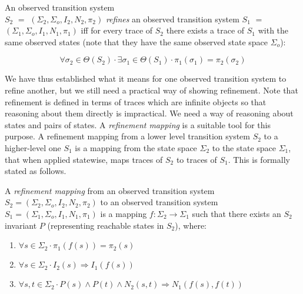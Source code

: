 \begin{definition}[Refinement]
\label{def-refinement}
An observed transition system\\ 
  $S_2$ $=$ $(\Sigma_2,\Sigma_o,I_2,N_2,\pi_2)$ 
{\em refines} an observed transition system   
  $S_1$ $=$ $(\Sigma_1,\Sigma_o,I_1,N_1,\pi_1)$ 
iff 
for every trace of $S_2$ there exists a trace of $S_1$ with the same observed states
(note that they have the same observed state space $\Sigma_o$):

\[
  \forall \sigma_2 \in \Theta(S_2) \cdot 
    \exists \sigma_1 \in \Theta(S_1) \cdot
      \pi_1(\sigma_1) = \pi_2(\sigma_2)
\]
\end{definition}

\noindent
We have thus established  what it means for one  observed transition
system to refine another, but we still need  a  practical way of
showing refinement.  Note  that 
refinement is defined in terms of traces which are infinite objects
so that reasoning about them directly is impractical.  We need a way  of
reasoning  about states and pairs of states. A {\em refinement mapping} is
a suitable tool for this purpose.  A 
refinement  mapping from  a  lower  level  transition system $S_2$ to   a
higher-level  one $S_1$ is    a mapping from the state space  $\Sigma_2$ to
the  state space $\Sigma_1$, that when applied statewise, 
maps traces of $S_2$ to traces of $S_1$.  This is formally stated as
follows.

\begin{definition}
\label{def-refinement-mapping}
A {\em refinement mapping} from an observed transition system
  $S_2 = (\Sigma_2,\Sigma_o,I_2,N_2,\pi_2)$
to an observed transition system
  $S_1 = (\Sigma_1,\Sigma_o,I_1,N_1,\pi_1)$
is a mapping $f : \Sigma_2 \rightarrow \Sigma_1$ such that there exists an
$S_2$ invariant $P$ (representing reachable states in $S_2$),  where:

\begin{enumerate}

 \item $\forall s \in \Sigma_2 \cdot \pi_1(f(s)) = \pi_2(s)$

 \item $\forall s \in \Sigma_2 \cdot I_2(s) \Rightarrow I_1(f(s))$

 \item $\forall s,t \in \Sigma_2 \cdot 
          P(s) \wedge P(t) \wedge N_2(s,t) \Rightarrow N_1(f(s),f(t))$ 
       
\end{enumerate}
\end{definition}


